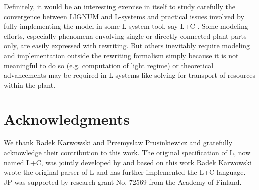 Definitely, it  would be  an interesting exercise  in itself  to study
carefully the  convergence between LIGNUM and  L-systems and practical
issues involved by fully implementing the model in some L-system tool,
say  L+C  \citep{karwowski:02}.   Some  modeling  efforts,  especially
phenomena envolving single or directly connected plant parts only, are
easily  expressed  with  rewriting.   But  others  inevitably  require
modeling  and implementation  outside the  rewriting  formalism simply
because  it is not  meaningful to  do so  (e.g.  computation  of light
regime) or theoretical advancements  may be required in L-systems like
solving for transport of resources within the plant.

\section{Acknowledgments}

We thank  Radek Karwowski and Przemyslaw  Prusinkiewicz and gratefully
acknowledge   their   contribution  to   this   work.   The   original
specification  of   L,  now  named  L+C,  was   jointly  developed  by
\citet{pp:99}  and  based  on  this  work Radek  Karwowski  wrote  the
original parser of L and  has further implemented the L+C language. JP
was supported by research grant No. 72569 from the Academy of Finland.
 